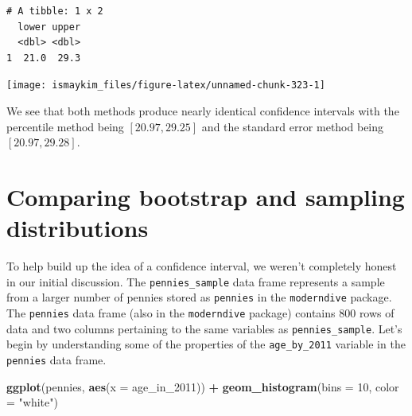 \documentclass[12pt,]{krantz}
\makeatletter
\newenvironment{Shaded}{\begin{snugshade}}{\end{snugshade}}
\newcommand{\KeywordTok}[1]{\textcolor[rgb]{0.27,0.27,0.27}{\textbf{#1}}}
\newcommand{\DataTypeTok}[1]{\textcolor[rgb]{0.27,0.27,0.27}{#1}}
\newcommand{\DecValTok}[1]{\textcolor[rgb]{0.06,0.06,0.06}{#1}}
\newcommand{\StringTok}[1]{\textcolor[rgb]{0.5,0.5,0.5}{#1}}
\newcommand{\OperatorTok}[1]{\textcolor[rgb]{0.43,0.43,0.43}{\textbf{#1}}}
\newcommand{\NormalTok}[1]{#1}
\newenvironment{kframe}{%
\medskip{}
\setlength{\fboxsep}{.8em}
 \def\at@end@of@kframe{}%
 \ifinner\ifhmode%
  \def\at@end@of@kframe{\end{minipage}}%
  \begin{minipage}{\columnwidth}%
 \fi\fi%
 \def\FrameCommand##1{\hskip\@totalleftmargin \hskip-\fboxsep
 \colorbox{shadecolor}{##1}\hskip-\fboxsep
     \hskip-\linewidth \hskip-\@totalleftmargin \hskip\columnwidth}%
 \MakeFramed {\advance\hsize-\width
   \@totalleftmargin\z@ \linewidth\hsize
   \@setminipage}}%
 {\par\unskip\endMakeFramed%
 \at@end@of@kframe}
\renewenvironment{Shaded}{\begin{kframe}}{\end{kframe}}
\theoremstyle{definition}
\theoremstyle{definition}
\theoremstyle{definition}
\theoremstyle{remark}
\makeatother
\begin{document}
\begin{verbatim}
# A tibble: 1 x 2
  lower upper
  <dbl> <dbl>
1  21.0  29.3
\end{verbatim}

\begin{Shaded}
\end{Shaded}

\begin{center}\texttt{[image: ismaykim\_files/figure-latex/unnamed-chunk-323-1]} \end{center}

We see that both methods produce nearly identical confidence intervals
with the percentile method being \([20.97, 29.25]\) and the standard
error method being \([20.97, 29.28]\).

\section{Comparing bootstrap and sampling
distributions}\label{comparing-bootstrap-and-sampling-distributions}

To help build up the idea of a confidence interval, we weren't
completely honest in our initial discussion. The
\texttt{pennies\_sample} data frame represents a sample from a larger
number of pennies stored as \texttt{pennies} in the \texttt{moderndive}
package. The \texttt{pennies} data frame (also in the
\texttt{moderndive} package) contains 800 rows of data and two columns
pertaining to the same variables as \texttt{pennies\_sample}. Let's
begin by understanding some of the properties of the
\texttt{age\_by\_2011} variable in the \texttt{pennies} data frame.

\begin{Shaded}
\begin{Highlighting}[]
\KeywordTok{ggplot}\NormalTok{(pennies, }\KeywordTok{aes}\NormalTok{(}\DataTypeTok{x =}\NormalTok{ age_in_}\DecValTok{2011}\NormalTok{)) }\OperatorTok{+}
\StringTok{  }\KeywordTok{geom_histogram}\NormalTok{(}\DataTypeTok{bins =} \DecValTok{10}\NormalTok{, }\DataTypeTok{color =} \StringTok{"white"}\NormalTok{)}
\end{Highlighting}
\end{Shaded}
\end{document}
